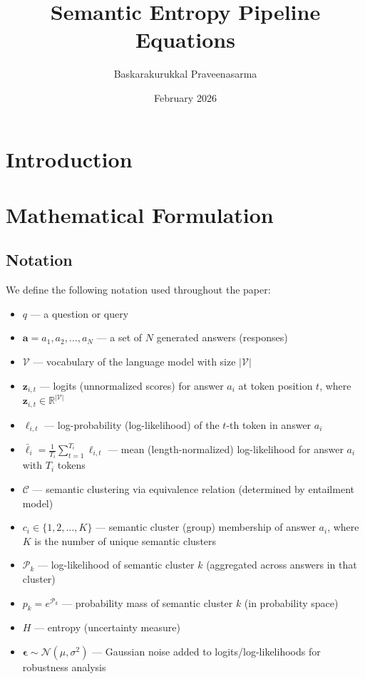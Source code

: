 \documentclass{article}
\title{Semantic Entropy Pipeline Equations}
\author{Baskarakurukkal Praveenasarma}
\date{February 2026}
\begin{document}
\maketitle

\section{Introduction}

\section{Mathematical Formulation}

\subsection{Notation}

We define the following notation used throughout the paper:
\begin{itemize}
    \item $q$ --- a question or query
    \item $\boldsymbol{a} = a_1, a_2, \ldots, a_N$ --- a set of $N$ generated answers (responses)
    \item $\mathcal{V}$ --- vocabulary of the language model with size $|{\mathcal{V}}|$
    \item $\boldsymbol{z}_{i,t}$ --- logits (unnormalized scores) for answer $a_i$ at token position $t$, where $\boldsymbol{z}_{i,t} \in \mathbb{R}^{|{\mathcal{V}}|}$
    \item $\ell_{i,t}$ --- log-probability (log-likelihood) of the $t$-th token in answer $a_i$
    \item $\bar{\ell}_i = \frac{1}{T_i} \sum_{t=1}^{T_i} \ell_{i,t}$ --- mean (length-normalized) log-likelihood for answer $a_i$ with $T_i$ tokens
    \item $\mathcal{C}$ --- semantic clustering via equivalence relation (determined by entailment model)
    \item $c_i \in \{1, 2, \ldots, K\}$ --- semantic cluster (group) membership of answer $a_i$, where $K$ is the number of unique semantic clusters
    \item $\mathcal{P}_k$ --- log-likelihood of semantic cluster $k$ (aggregated across answers in that cluster)
    \item $p_k = e^{\mathcal{P}_k}$ --- probability mass of semantic cluster $k$ (in probability space)
    \item $H$ --- entropy (uncertainty measure)
    \item $\boldsymbol{\epsilon} \sim \mathcal{N}(\mu, \sigma^2)$ --- Gaussian noise added to logits/log-likelihoods for robustness analysis
\end{itemize}
\end{document}

